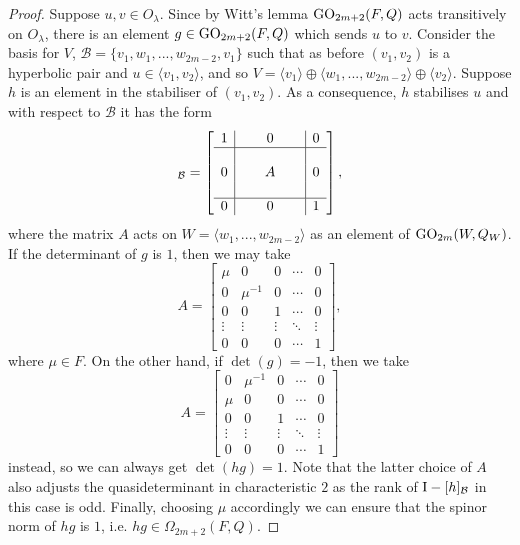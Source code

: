 \begin{proof}
    Suppose $u, v \in O_{\lambda}$. Since by Witt's lemma $\mathrm{GO}_{2m+2}(F,Q)$
    acts transitively on $O_{\lambda}$, there is an element 
    $g \in \mathrm{GO}_{2m+2}(F,Q)$ which sends $u$ to $v$. Consider the basis 
    for $V$, $\mathcal{B} = \{v_1, w_1, ..., w_{2m-2}, v_1\}$ such that as before
    $(v_1,v_2)$ is a hyperbolic pair and $u \in \langle v_1, v_2 \rangle$, and so
    $V = \langle v_1 \rangle \oplus \langle w_1, ..., w_{2m-2} \rangle
    \oplus \langle v_2 \rangle$. Suppose $h$ is an element in the stabiliser of $(v_1,v_2)$.
    As a consequence, $h$ stabilises $u$ and with respect to $\mathcal{B}$ it has 
    the form
    \begin{equation*}
	[h]_{\mathcal{B}} = \left[
	    \begin{array}{c|c|c}
		1 & 0 & 0 \\ \hline 
		 & & \\
		0 &\ \ \ \ \ A\ \ \ \ \  & 0 \\ 
		 & & \\ \hline 
		0 & 0 & 1
	    \end{array}
	\right],
    \end{equation*}
    where the matrix $A$ acts on \mbox{$W=\langle w_1, ..., w_{2m-2} \rangle$} as an
     element of $\mathrm{GO}_{2m}(W,Q_W)$. If the determinant of $g$ is $1$,
    then we may take
    \begin{equation*}
	A = \begin{bmatrix}
	    \mu & 0 & 0 & \cdots & 0 \\
	    0 & \mu^{-1} & 0 & \cdots & 0 \\
	    0 & 0 & 1 & \cdots & 0 \\
	    \vdots & \vdots & \vdots & \ddots & \vdots \\
	    0 & 0 & 0 & \cdots & 1
	\end{bmatrix},
    \end{equation*}
    where $\mu \in F$. On the other hand, if $\det(g) = -1$, then we take		
    \begin{equation*}
	A = \begin{bmatrix}
	    0 & \mu^{-1} & 0 & \cdots & 0 \\
	    \mu & 0 & 0 & \cdots & 0 \\
	    0 & 0 & 1 & \cdots & 0 \\
	    \vdots & \vdots & \vdots & \ddots & \vdots \\
	    0 & 0 & 0 & \cdots & 1
	\end{bmatrix}
    \end{equation*}	
    instead, so we can always get $\det(hg) = 1$. Note that the latter choice of 
    $A$ also adjusts the quasideterminant in characteristic $2$ as the 
    rank of $\mathord{\mathrm{I}}-[h]_{\mathcal{B}}$ in this case is odd. 
    Finally, choosing $\mu$ accordingly 
    we can ensure that the spinor norm of $hg$ is $1$, i.e. $hg \in \Omega_{2m+2}(F,Q)$. 
\end{proof}

